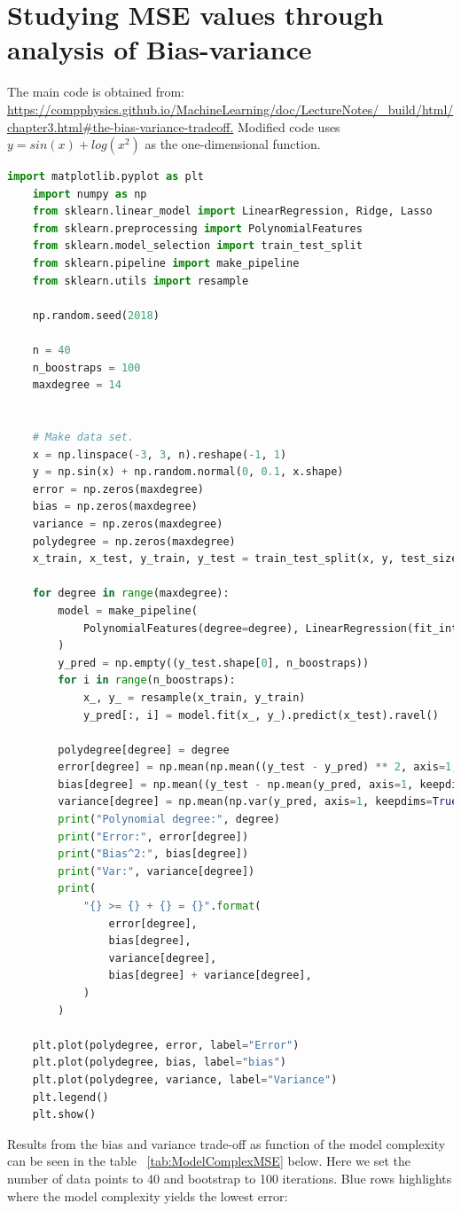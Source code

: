 %
\section{Studying MSE values through analysis of Bias-variance}
%

\hfill\break
The main code is obtained from: \url{https://compphysics.github.io/MachineLearning/doc/LectureNotes/_build/html/chapter3.html#the-bias-variance-tradeoff.}
\hfill\break
Modified code uses $y=sin(x)+log(x^2)$ as the one-dimensional function.


    \begin{lstlisting}[language=Python]
    import matplotlib.pyplot as plt
    import numpy as np
    from sklearn.linear_model import LinearRegression, Ridge, Lasso
    from sklearn.preprocessing import PolynomialFeatures
    from sklearn.model_selection import train_test_split
    from sklearn.pipeline import make_pipeline
    from sklearn.utils import resample

    np.random.seed(2018)

    n = 40
    n_boostraps = 100
    maxdegree = 14


    # Make data set.
    x = np.linspace(-3, 3, n).reshape(-1, 1)
    y = np.sin(x) + np.random.normal(0, 0.1, x.shape)
    error = np.zeros(maxdegree)
    bias = np.zeros(maxdegree)
    variance = np.zeros(maxdegree)
    polydegree = np.zeros(maxdegree)
    x_train, x_test, y_train, y_test = train_test_split(x, y, test_size=0.2)

    for degree in range(maxdegree):
        model = make_pipeline(
            PolynomialFeatures(degree=degree), LinearRegression(fit_intercept=False)
        )
        y_pred = np.empty((y_test.shape[0], n_boostraps))
        for i in range(n_boostraps):
            x_, y_ = resample(x_train, y_train)
            y_pred[:, i] = model.fit(x_, y_).predict(x_test).ravel()

        polydegree[degree] = degree
        error[degree] = np.mean(np.mean((y_test - y_pred) ** 2, axis=1, keepdims=True))
        bias[degree] = np.mean((y_test - np.mean(y_pred, axis=1, keepdims=True)) ** 2)
        variance[degree] = np.mean(np.var(y_pred, axis=1, keepdims=True))
        print("Polynomial degree:", degree)
        print("Error:", error[degree])
        print("Bias^2:", bias[degree])
        print("Var:", variance[degree])
        print(
            "{} >= {} + {} = {}".format(
                error[degree],
                bias[degree],
                variance[degree],
                bias[degree] + variance[degree],
            )
        )

    plt.plot(polydegree, error, label="Error")
    plt.plot(polydegree, bias, label="bias")
    plt.plot(polydegree, variance, label="Variance")
    plt.legend()
    plt.show()
    \end{lstlisting}
Results from the bias and variance trade-off as function of the model complexity can be seen in the table ~\ref{tab:ModelComplexMSE} below.
Here we set the number of data points to 40 and bootstrap to 100 iterations.
Blue rows highlights where the model complexity yields the lowest error:

